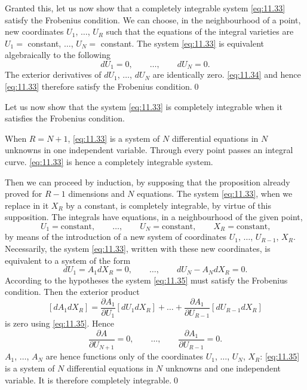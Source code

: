 \documentclass[leqno,11pt]{book}
\numberwithin{equation}{chapter}
\newcommand{\pd}{\partial}
\theoremstyle{shape1}
\theoremstyle{shapesmall}
\newcommand{\somespace}{\vspace{9pt}}
\begin{document}
Granted this, let us now show that a completely integrable system \eqref{eq:11.33} satisfy the Frobenius condition. We can choose, in the neighbourhood of a point, new coordinates $U_{1}$, $\dots$, $U_{R}$ such that the equations of the integral varieties are $U_{1}=$ constant, $\dots$, $U_{N}=$ constant. The system \eqref{eq:11.33} is equivalent algebraically to the following
\begin{equation}
  \label{eq:11.34}
  dU_{1}=0,\qquad\dots,\qquad dU_{N}=0.
\end{equation}
The exterior derivatives of $dU_{1}$, $\dots$, $dU_{N}$ are identically zero. \eqref{eq:11.34} and hence \eqref{eq:11.33} therefore satisfy the Frobenius condition.\qed

\somespace

Let us now show that the system \eqref{eq:11.33} is completely integrable when it satisfies the Frobenius condition.

When $R=N+1$, \eqref{eq:11.33} is a system of $N$ differential equations in $N$ unknowns in one independent variable. Through every point passes an integral curve. \eqref{eq:11.33} is hence a completely integrable system.

Then we can proceed by induction, by supposing that the proposition already proved for $R-1$ dimensions and $N$ equations. The system \eqref{eq:11.33}, when we replace in it $X_{R}$ by a constant, is completely integrable, by virtue of this supposition. The integrals have equations, in a neighbourhood of the given point,
\[
U_{1}=\text{constant}, \qquad\dots,\qquad U_{N}=\text{constant},\qquad X_{R}=\text{constant,}
\]
by means of the introduction of a new system of coordinates $U_{1}$, $\dots$, $U_{R-1}$, $X_{R}$. Necessarily, the system \eqref{eq:11.33}, written with these new coordinates, is equivalent to a system of the form
\begin{equation}
  \label{eq:11.35}
  dU_{1}=A_{1}dX_{R}=0,\qquad\dots,\qquad dU_{N}-A_{N}dX_{R}=0.
\end{equation}
According to the hypotheses the system \eqref{eq:11.35} must satisfy the Frobenius condition. Then the exterior product
\[
[dA_{1}dX_{R}]=\frac{\pd A_{1}}{\pd U_{1}}[dU_{1}dX_{R}]+\dots+\frac{\pd A_{1}}{\pd U_{R-1}}[dU_{R-1}dX_{R}]
\]
is zero using \eqref{eq:11.35}. Hence
\[
\frac{\pd A}{\pd U_{N+1}}=0,\qquad\dots,\qquad\frac{\pd A_{1}}{\pd U_{R-1}}=0.
\]
$A_{1}$, $\dots$, $A_{N}$ are hence functions only of the coordinates $U_{1}$, $\dots$, $U_{N}$, $X_{R}$: \eqref{eq:11.35} is a system of $N$ differential equations in $N$ unknowns and one independent variable. It is therefore completely integrable.\qed
\end{document}
